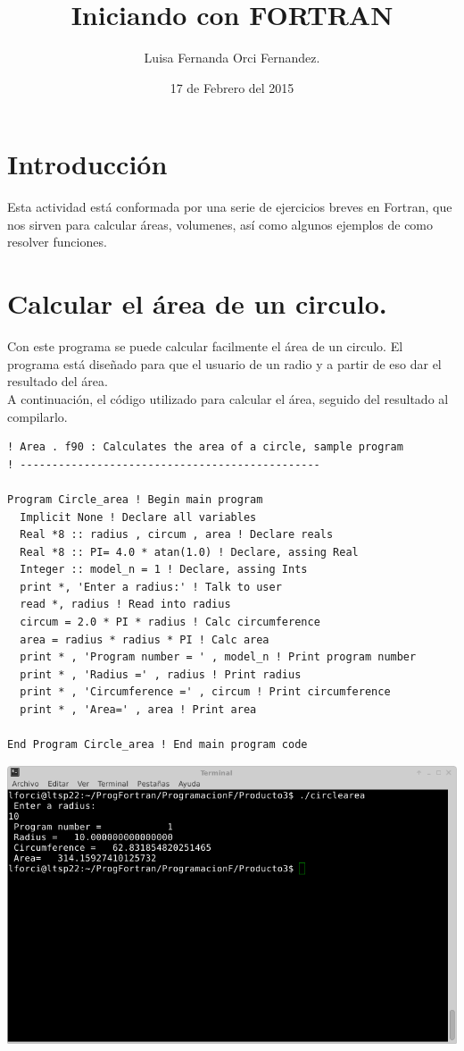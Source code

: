 \documentclass[10pt]{article}
\title{Iniciando con FORTRAN}
\author{Luisa Fernanda Orci Fernandez.}
\date{17 de Febrero del 2015}
\begin{document}
\maketitle
\section{Introducción}
Esta actividad está conformada por una serie de ejercicios breves en Fortran, que nos sirven para calcular áreas, volumenes, así como algunos ejemplos de como resolver funciones.\\

\section{Calcular el área de un circulo.}
Con este programa se puede calcular facilmente el área de un circulo. El programa está diseñado para que el usuario de un radio y a partir de eso dar el resultado del área.\\
A continuación, el código utilizado para calcular el área, seguido del resultado al compilarlo.
\begin{verbatim}
! Area . f90 : Calculates the area of a circle, sample program
! -----------------------------------------------

Program Circle_area ! Begin main program
  Implicit None ! Declare all variables
  Real *8 :: radius , circum , area ! Declare reals
  Real *8 :: PI= 4.0 * atan(1.0) ! Declare, assing Real
  Integer :: model_n = 1 ! Declare, assing Ints
  print *, 'Enter a radius:' ! Talk to user
  read *, radius ! Read into radius
  circum = 2.0 * PI * radius ! Calc circumference
  area = radius * radius * PI ! Calc area
  print * , 'Program number = ' , model_n ! Print program number
  print * , 'Radius =' , radius ! Print radius
  print * , 'Circumference =' , circum ! Print circumference
  print * , 'Area=' , area ! Print area
 
End Program Circle_area ! End main program code
\end{verbatim}
\includegraphics[scale=0.6]{CircleArea}
\end{document}
